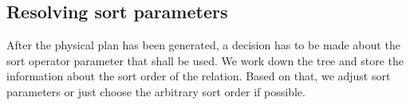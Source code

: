 \subsection{Resolving sort parameters}

After the physical plan has been generated, a decision has to be made about the sort operator parameter that shall be used. We work down the tree and store the information about the sort order of the relation. Based on that, we adjust sort parameters or just choose the arbitrary sort order if possible.

